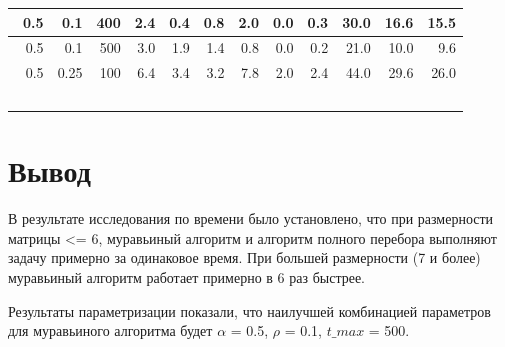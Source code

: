 \begin{longtable}{|r|r|r|r|r|r|r|r|r|r|r|r|}
    \hline \
    0.5                            & 0.1                    & 400                       & 2.4                       & 0.4                       & 0.8                       & 2.0                       & 0.0                       & 0.3                       & 30.0                      & 16.6                      & 15.5                      \\
    \hline \
    0.5                            & 0.1                    & 500                       & 3.0                       & 1.9                       & 1.4                       & 0.8                       & 0.0                       & 0.2                       & 21.0                      & 10.0                      & 9.6                      \\
    \hline \
    0.5 & 0.25 & 100 & 6.4 & 3.4 & 3.2 & 7.8 & 2.0 & 2.4 & 44.0 & 29.6 & 26.0 \\
    \hline
    \
\end{longtable}

\section*{Вывод}

В результате исследования по времени было установлено, что при размерности матрицы <= 6,
муравьиный алгоритм и алгоритм полного перебора выполняют задачу примерно за одинаковое время.
При большей размерности (7 и более) муравьиный алгоритм работает примерно в 6 раз быстрее.

Результаты параметризации показали, что наилучшей комбинацией параметров для муравьиного алгоритма будет
$\alpha$ = 0.5, $\rho$ = 0.1, $t\_{max}$ = 500.

\clearpage
